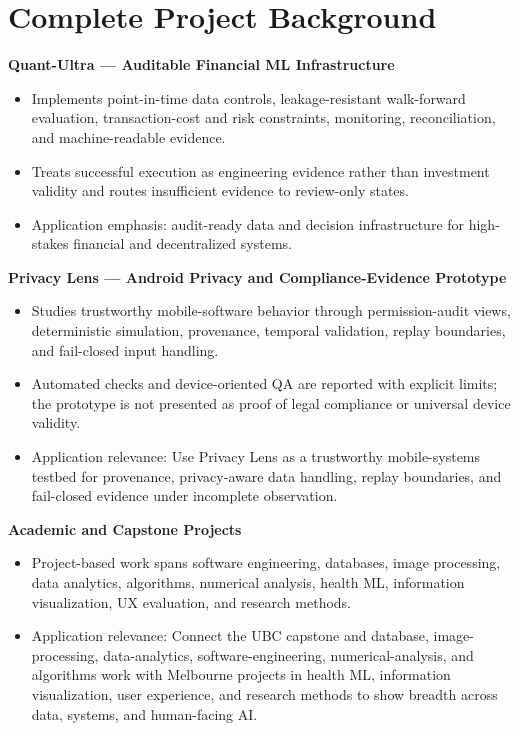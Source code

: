 \documentclass[11pt]{article}
\begin{document}
\section*{Complete Project Background}
\textbf{Quant-Ultra --- Auditable Financial ML Infrastructure}
\begin{itemize}
\item Implements point-in-time data controls, leakage-resistant walk-forward evaluation, transaction-cost and risk constraints, monitoring, reconciliation, and machine-readable evidence.
\item Treats successful execution as engineering evidence rather than investment validity and routes insufficient evidence to review-only states.
\item Application emphasis: audit-ready data and decision infrastructure for high-stakes financial and decentralized systems.
\end{itemize}

\textbf{Privacy Lens --- Android Privacy and Compliance-Evidence Prototype}
\begin{itemize}
\item Studies trustworthy mobile-software behavior through permission-audit views, deterministic simulation, provenance, temporal validation, replay boundaries, and fail-closed input handling.
\item Automated checks and device-oriented QA are reported with explicit limits; the prototype is not presented as proof of legal compliance or universal device validity.
\item Application relevance: Use Privacy Lens as a trustworthy mobile-systems testbed for provenance, privacy-aware data handling, replay boundaries, and fail-closed evidence under incomplete observation.
\end{itemize}

\textbf{Academic and Capstone Projects}
\begin{itemize}
\item Project-based work spans software engineering, databases, image processing, data analytics, algorithms, numerical analysis, health ML, information visualization, UX evaluation, and research methods.
\item Application relevance: Connect the UBC capstone and database, image-processing, data-analytics, software-engineering, numerical-analysis, and algorithms work with Melbourne projects in health ML, information visualization, user experience, and research methods to show breadth across data, systems, and human-facing AI.
\end{itemize}
\end{document}
